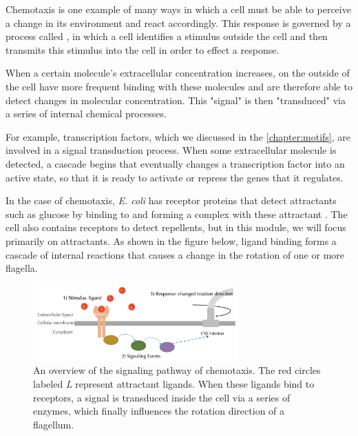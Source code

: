 Chemotaxis is one example of many ways in which a cell must be able to perceive a change in its environment and react accordingly. This response is governed by a process called , in which a cell identifies a stimulus outside the cell and then transmits this stimulus into the cell in order to effect a response.

When a certain molecule's extracellular concentration increases,  on the outside of the cell have more frequent binding with these molecules and are therefore able to detect changes in molecular concentration. This "signal" is then "transduced" via a series of internal chemical processes.

For example, transcription factors, which we discussed in the \autoref{chapter:motifs}, are involved in a signal transduction process. When some extracellular molecule is detected, a cascade begins that eventually changes a transcription factor into an active state, so that it is ready to activate or repress the genes that it regulates.

In the case of chemotaxis, \textit{E. coli} has receptor proteins that detect attractants such as glucose by binding to and forming a complex with these attractant . The cell also contains receptors to detect repellents, but in this module, we will focus primarily on attractants. As shown in the figure below, ligand binding forms a cascade of internal reactions that causes a change in the rotation of one or more flagella.

\begin{figure}[h]
\centering
\mySfFamily
\includegraphics[width = 0.7\textwidth]{../images/chemotaxis_signal.png}
\caption{An overview of the signaling pathway of chemotaxis. The red circles labeled \textit{L} represent attractant ligands. When these ligands bind to receptors, a signal is transduced inside the cell via a series of enzymes, which finally influences the rotation direction of a flagellum.}
\label{fig:chemotaxis_signal}
\end{figure}

